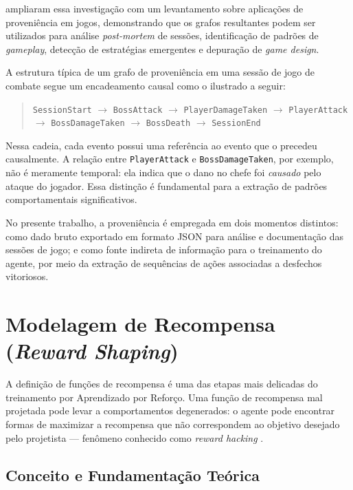  ampliaram essa investigação com um
levantamento sobre aplicações de proveniência em jogos, demonstrando que os
grafos resultantes podem ser utilizados para análise \textit{post-mortem} de
sessões, identificação de padrões de \textit{gameplay}, detecção de
estratégias emergentes e depuração de \textit{game design}.

A estrutura típica de um grafo de proveniência em uma sessão de jogo de
combate segue um encadeamento causal como o ilustrado a seguir:

\begin{quote}
    \texttt{SessionStart} $\rightarrow$ \texttt{BossAttack} $\rightarrow$
    \texttt{PlayerDamageTaken} $\rightarrow$ \texttt{PlayerAttack}
    $\rightarrow$ \texttt{BossDamageTaken} $\rightarrow$
    \texttt{BossDeath} $\rightarrow$ \texttt{SessionEnd}
\end{quote}

Nessa cadeia, cada evento possui uma referência ao evento que o precedeu
causalmente. A relação entre \texttt{PlayerAttack} e
\texttt{BossDamageTaken}, por exemplo, não é meramente temporal: ela indica
que o dano no chefe foi \textit{causado} pelo ataque do jogador. Essa
distinção é fundamental para a extração de padrões comportamentais
significativos.

No presente trabalho, a proveniência é empregada em dois momentos distintos:
como dado bruto exportado em formato JSON para análise e documentação das
sessões de jogo; e como fonte indireta de informação para o treinamento do
agente, por meio da extração de sequências de ações associadas a desfechos
vitoriosos.

\section{Modelagem de Recompensa (\textit{Reward Shaping})}
\label{sec:reward-shaping}

A definição de funções de recompensa é uma das etapas mais delicadas do
treinamento por Aprendizado por Reforço. Uma função de recompensa mal
projetada pode levar a comportamentos degenerados: o agente pode encontrar
formas de maximizar a recompensa que não correspondem ao objetivo desejado
pelo projetista --- fenômeno conhecido como \textit{reward hacking}
\cite{sutton2018reinforcement}.

\subsection{Conceito e Fundamentação Teórica}
\label{subsec:reward-shaping-conceito}

